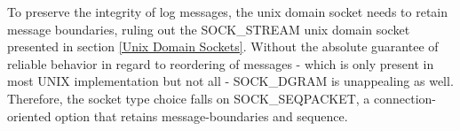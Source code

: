 To preserve the integrity of log messages, the unix domain socket needs to retain message boundaries, ruling out the SOCK\_STREAM unix domain socket presented in section \ref{Unix Domain Sockets}.
Without the absolute guarantee of reliable behavior in regard to reordering of messages - which is only present in most UNIX implementation but not all\cite{man:unixsockets} - SOCK\_DGRAM is unappealing as well.
Therefore, the socket type choice falls on SOCK\_SEQPACKET, a connection-oriented option that retains message-boundaries and sequence.